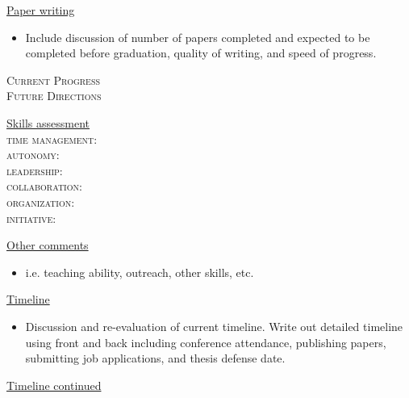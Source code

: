 \documentclass[12pt,onecolumn]{article}
\begin{document}
{\large
\underline{Paper writing}}
\begin{itemize}
\item Include discussion of number of papers completed and expected to be completed before graduation, quality of writing, and speed of progress.
\end{itemize}

\textsc{Current Progress}\\ \vspace{36pt}
\textsc{Future Directions}\\ \vspace{42pt}

\newpage


{\large
\underline{Skills assessment}}\\
\textsc{time management:}\\
\textsc{autonomy:}\\
\textsc{leadership:}\\
\textsc{collaboration:}\\
\textsc{organization:}\\
\textsc{initiative:}\\
\vspace{16pt}

{\large
\underline{Other comments}}
\begin{itemize}
\item i.e. teaching ability, outreach, other skills, etc.
\end{itemize}
\vspace{72pt}


{\large
\underline{Timeline}}
\begin{itemize}
\item Discussion and re-evaluation of current timeline. Write out detailed timeline using front and back including conference attendance, publishing papers, submitting job applications, and thesis defense date.
\end{itemize}

\newpage
{\large
\underline{Timeline continued}}
\end{document}
